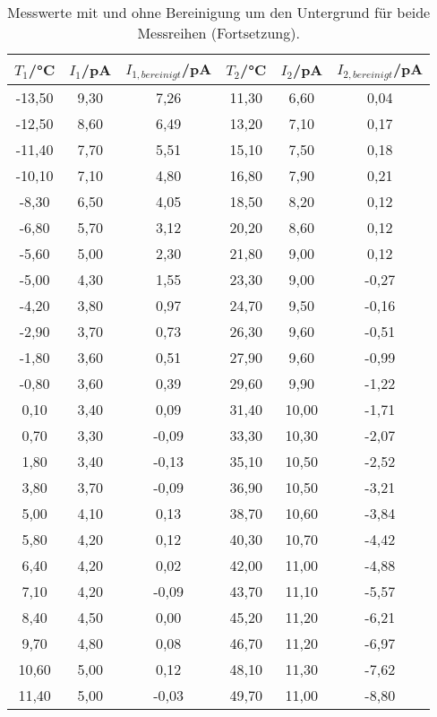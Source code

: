   \begin{table}[htp]
  	\begin{center}
      \caption{Messwerte mit und ohne Bereinigung um den Untergrund für beide Messreihen (Fortsetzung).}
      \label{tab:messwerte2}
  		\begin{tabular}{cccccc}
  		\toprule
  			{$T_1$/°C} & {$I_1$/pA} & {$I_{1,bereinigt}$/pA} & {$T_2$/°C} & {$I_2$/pA} & {$I_{2,bereinigt}$/pA}\\
  			\midrule
				-13,50 & 9,30 & 7,26  & 11,30 & 6,60 & 0,04\\
				-12,50 & 8,60 & 6,49  & 13,20 & 7,10 & 0,17\\
				-11,40 & 7,70 & 5,51  & 15,10 & 7,50 & 0,18\\
				-10,10 & 7,10 & 4,80  & 16,80 & 7,90 & 0,21\\
				-8,30  & 6,50 & 4,05  & 18,50 & 8,20 & 0,12\\
				-6,80  & 5,70 & 3,12  & 20,20 & 8,60 & 0,12\\
				-5,60  & 5,00 & 2,30  & 21,80 & 9,00 & 0,12\\
				-5,00  & 4,30 & 1,55  & 23,30 & 9,00 & -0,27\\
				-4,20  & 3,80 & 0,97  & 24,70 & 9,50 & -0,16\\
				-2,90  & 3,70 & 0,73  & 26,30 & 9,60 & -0,51\\
				-1,80  & 3,60 & 0,51  & 27,90 & 9,60 & -0,99\\
				-0,80  & 3,60 & 0,39  & 29,60 & 9,90 & -1,22\\
				0,10 	 & 3,40 & 0,09  & 31,40 & 10,00& -1,71\\
				0,70 	 & 3,30 & -0,09 & 33,30 & 10,30& -2,07\\
				1,80 	 & 3,40 & -0,13 & 35,10 & 10,50& -2,52\\
				3,80 	 & 3,70 & -0,09 & 36,90 & 10,50& -3,21\\
				5,00 	 & 4,10 & 0,13  & 38,70 & 10,60& -3,84\\
				5,80 	 & 4,20 & 0,12  & 40,30 & 10,70& -4,42\\
				6,40 	 & 4,20 & 0,02  & 42,00 & 11,00& -4,88\\
				7,10 	 & 4,20 & -0,09 & 43,70 & 11,10& -5,57\\
				8,40 	 & 4,50 & 0,00  & 45,20 & 11,20& -6,21\\
				9,70 	 & 4,80 & 0,08  & 46,70 & 11,20& -6,97\\
				10,60  & 5,00 & 0,12  & 48,10 & 11,30& -7,62\\
				11,40  & 5,00 & -0,03 & 49,70 & 11,00& -8,80\\

\end{tabular}
\end{center}
\end{table}
